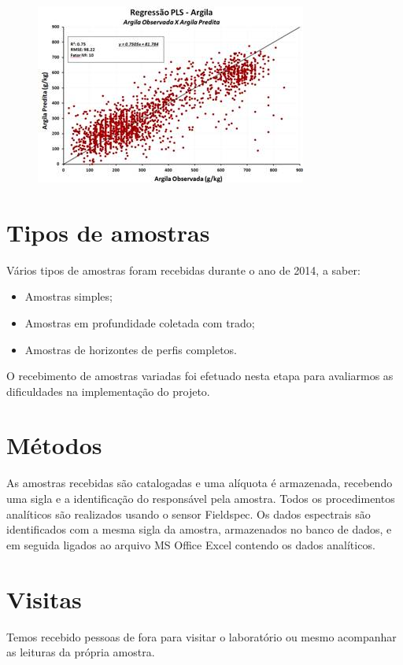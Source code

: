 \begin{figure}
  \includegraphics{figuras/image003}
\end{figure}

\section{Tipos de amostras}

Vários tipos de amostras foram recebidas durante o ano de 2014, a saber:

\begin{itemize}
  \item Amostras simples;
  \item Amostras em profundidade coletada com trado;
  \item Amostras de horizontes de perfis completos.
\end{itemize}

O recebimento de amostras variadas foi efetuado nesta etapa para avaliarmos as dificuldades na implementação do projeto.

\section{Métodos}

As amostras recebidas são catalogadas e uma alíquota é armazenada, recebendo uma sigla e a identificação do responsável pela amostra. Todos os procedimentos analíticos são realizados usando o sensor Fieldspec. Os dados espectrais são identificados com a mesma sigla da amostra, armazenados no banco de dados, e em seguida ligados ao arquivo MS Office Excel contendo os dados analíticos.

\section{Visitas}

Temos recebido pessoas de fora para visitar o laboratório ou mesmo acompanhar as leituras da própria amostra.

